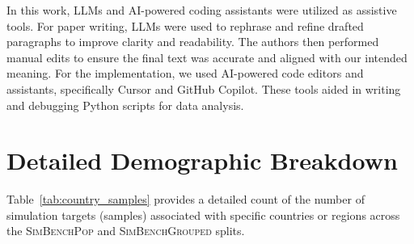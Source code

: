 \documentclass{article} %
\begin{document}
In this work, LLMs and AI-powered coding assistants were utilized as assistive tools. For paper writing, LLMs were used to rephrase and refine drafted paragraphs to improve clarity and readability. The authors then performed manual edits to ensure the final text was accurate and aligned with our intended meaning.
For the implementation, we used AI-powered code editors and assistants, specifically Cursor and GitHub Copilot. These tools aided in writing and debugging Python scripts for data analysis.



\section{Detailed Demographic Breakdown}
\label{app:country_breakdown}

Table~\ref{tab:country_samples} provides a detailed count of the number of simulation targets (samples) associated with specific countries or regions across the \textsc{SimBenchPop} and \textsc{SimBenchGrouped} splits.
\end{document}
